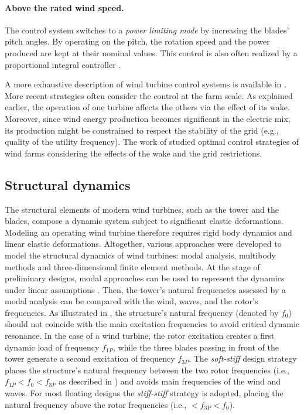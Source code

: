 \paragraph{Above the rated wind speed.}
The control system switches to a \textit{power limiting mode} by increasing the blades' pitch angles. 
By operating on the pitch, the rotation speed and the power produced are kept at their nominal values. 
This control is also often realized by a proportional integral controller \citep{bossanyi_2003_pitch_control}. 

A more exhaustive description of wind turbine control systems is available in \citet[Chap. 8]{burton_2021_wind_handbook}. 
More recent strategies often consider the control at the farm scale. 
As explained earlier, the operation of one turbine affects the others via the effect of its wake. 
Moreover, since wind energy production becomes significant in the electric mix, its production might be constrained to respect the stability of the grid (e.g., quality of the utility frequency).  
The work of \citet{gionfra_2018_control} studied optimal control strategies of wind farms considering the effects of the wake and the grid restrictions. 

\subsection{Structural dynamics}

The structural elements of modern wind turbines, such as the tower and the blades, compose a dynamic system subject to significant elastic deformations. 
Modeling an operating wind turbine therefore requires rigid body dynamics and linear elastic deformations. 
Altogether, various approaches were developed to model the structural dynamics of wind turbines: modal analysis, multibody methods and three-dimensional finite element methods. 
At the stage of preliminary designs, modal approaches can be used to represent the dynamics under linear assumptions \citep{hegseth_2019_modal_FOWT}. 
Then, the tower's natural frequencies assessed by a modal analysis can be compared with the wind, waves, and the rotor's frequencies. 
As illustrated in , the structure's natural frequency (denoted by $f_0$) should not coincide with the main excitation frequencies to avoid critical dynamic resonance.
In the case of a wind turbine, the rotor excitation creates a first dynamic load of frequency $f_{1P}$, while the three blades passing in front of the tower generate a second excitation of frequency $f_{3P}$.  
The \textit{soft-stiff} design strategy places the structure's natural frequency between the two rotor frequencies (i.e., $f_{1P} < f_0 < f_{3P}$ as described in ) and avoids main frequencies of the wind and waves. 
For most floating designs the \textit{stiff-stiff} strategy is adopted, placing the natural frequency above the rotor frequencies (i.e., $< f_{3P}<f_0$). 

